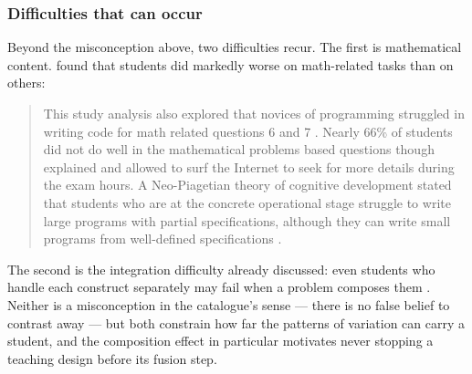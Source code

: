 \subsubsection{Difficulties that can occur}

Beyond the misconception above, two difficulties recur. The first is
mathematical content.
\textcite{KumarVeerasamy2016} found that students did markedly worse on
math-related tasks than on others:
\blockcquote{KumarVeerasamy2016}{This study analysis also explored that novices
of programming struggled in writing code for math related questions 6 and 7
\textelp{}. Nearly 66\% of students did not do well in the mathematical problems
based questions though explained and allowed to surf the Internet to seek for
more details during the exam hours. A Neo-Piagetian theory of cognitive
development stated that students who are at the concrete operational stage
struggle to write large programs with partial specifications, although they can
write small programs from well-defined specifications \textelp{}.}

The second is the integration difficulty already discussed: even students who
handle each construct separately may fail when a problem composes them
\autocite{Huang2024Composition}. Neither is a misconception in the
catalogue's sense --- there is no false belief to contrast away --- but both
constrain how far the patterns of variation can carry a student, and the
composition effect in particular motivates never stopping a teaching design
before its fusion step.
